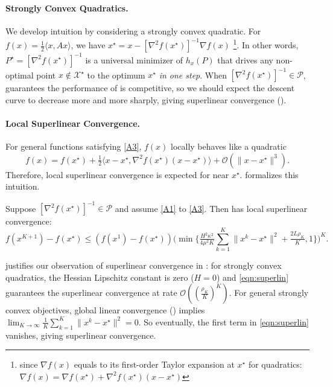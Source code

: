 \paragraph{Strongly Convex Quadratics.}  We develop intuition by considering a strongly convex quadratic. For $f (x) = \tfrac{1}{2} \langle x, A x \rangle$, we have $x^{\star} = x - [\nabla^2 f (x^{\star})]^{- 1} \nabla f (x)$ \footnote{since $\nabla f(x)$ equals to its first-order Taylor expansion at $x^{\star}$ for quadratics: $\nabla f(x) = \nabla f(x^{\star}) + \nabla^2 f(x^\star) (x - x^\star)$}.
In other words, $P^{\star} = [\nabla^2 f (x^{\star})]^{- 1}$ is a universal minimizer of $h_x(P)$ that drives any non-optimal point $x \nin \mathcal{X}^{\star}$ to the optimum $x^{\star}$ \emph{in one step}. When $[\nabla^2 f (x^{\star})]^{- 1} \in \mathcal{P}$, 
 guarantees the performance of {\hdm} is competitive,
so we should expect the descent curve to decrease more and more sharply, giving superlinear convergence ().

\paragraph{Local Superlinear Convergence.}
For general functions satisfying \ref{A3}, $f(x)$ locally behaves like a quadratic
 \begin{equation*}
   f (x) = f (x^{\star}) + \tfrac{1}{2} \langle x - x^{\star}, \nabla^2 f (x^{\star}) (x - x^{\star}) \rangle +\mathcal{O} (\| x - x^{\star} \|^3).
 \end{equation*}
Therefore, local superlinear convergence is expected for {\hdm} near $x^{\star}$.  formalizes this intuition.

\begin{thm}\label{thm:superlin}
Suppose $ [\nabla^2 f (x^{\star})]^{- 1} \in \mathcal{P}$ and assume \ref{A1} to \ref{A3}. Then  has local superlinear convergence:
\begin{equation} \label{eqn:superlin}
f (x^{K + 1}) - f (x^{\star}) \leq{} (f (x^{1}) - f (x^{\star})) \big(\min\{\tfrac{H^2 \kappa^2}{4 \mu^2 K} \textstyle\sum_{k = 1}^K {\| x^k - x^{\star} \|^2} + \tfrac{2L \rho_K}{K}, 1 \} \big)^K.
\end{equation}
\end{thm}
 justifies our observation of superlinear convergence in : for strongly convex quadratics, the Hessian Lipschitz constant is zero ($H = 0$) and \eqref{eqn:superlin} guarantees the superlinear convergence at rate $\mathcal{O} ( ( \tfrac{\rho_K}{K} )^K )$. 
For general strongly convex objectives, global linear convergence () implies 
$\lim_{K \rightarrow \infty} \frac{1}{K} \textstyle \sum_{k = 1}^K
\| x^k - x^{\star} \|^2 = 0$. 
So eventually, the first term in \eqref{eqn:superlin} vanishes, giving superlinear convergence.

